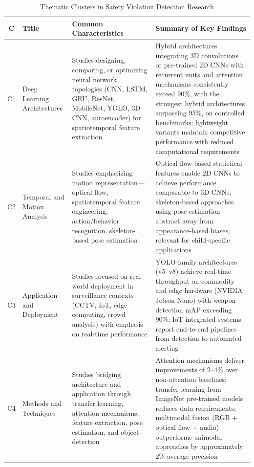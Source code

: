 \documentclass[conference]{IEEEtran}
\begin{document}
\begin{table}[t]
\caption{Thematic Clusters in Safety Violation Detection Research}
\begin{center}
\scriptsize
\setlength{\tabcolsep}{3pt}
\renewcommand{\arraystretch}{1.15}
\begin{tabular}{|c|p{2.2cm}|p{5.0cm}|p{5.0cm}|}
\hline
\textbf{C} & \textbf{Title} & \textbf{Common Characteristics} & \textbf{Summary of Key Findings} \\
\hline
C1 & Deep Learning Architectures & Studies designing, comparing, or optimizing neural network topologies (CNN, LSTM, GRU, ResNet, MobileNet, YOLO, 3D CNN, autoencoder) for spatiotemporal feature extraction & Hybrid architectures integrating 3D convolutions or pre-trained 2D CNNs with recurrent units and attention mechanisms consistently exceed 90\%, with the strongest hybrid architectures surpassing 95\%, on controlled benchmarks; lightweight variants maintain competitive performance with reduced computational requirements \\
\hline
C2 & Temporal and Motion Analysis & Studies emphasizing motion representation---optical flow, spatiotemporal feature engineering, action/behavior recognition, skeleton-based pose estimation & Optical flow-based statistical features enable 2D CNNs to achieve performance comparable to 3D CNNs; skeleton-based approaches using pose estimation abstract away from appearance-based biases, relevant for child-specific applications \\
\hline
C3 & Application and Deployment & Studies focused on real-world deployment in surveillance contexts (CCTV, IoT, edge computing, crowd analysis) with emphasis on real-time performance & YOLO-family architectures (v5--v8) achieve real-time throughput on commodity and edge hardware (NVIDIA Jetson Nano) with weapon detection mAP exceeding 90\%; IoT-integrated systems report end-to-end pipelines from detection to automated alerting \\
\hline
C4 & Methods and Techniques & Studies bridging architecture and application through transfer learning, attention mechanisms, feature extraction, pose estimation, and object detection & Attention mechanisms deliver improvements of 2--4\% over non-attention baselines; transfer learning from ImageNet pre-trained models reduces data requirements; multimodal fusion (RGB + optical flow + audio) outperforms unimodal approaches by approximately 2\% average precision \\
\hline
\end{tabular}
\label{tab:clusters}
\end{center}
\end{table}
\end{document}
